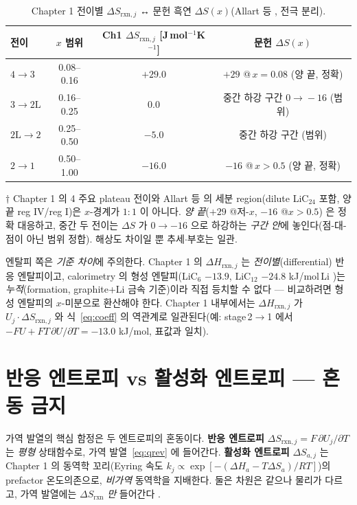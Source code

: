 \documentclass[11pt,a4paper]{article}
\newcommand{\rxn}{\mathrm{rxn}}
\begin{document}
\begin{table}[t]
\centering\small
\renewcommand{\arraystretch}{1.2}
\caption{Chapter 1 전이별 $\Delta S_{\rxn,j}$ ↔ 문헌 흑연 $\Delta S(x)$(Allart 등 \cite{allart2018}, 전극 분리).}
\label{tab:ds}
\begin{tabular}{l c c c}
\toprule
전이 & $x$ 범위 & Ch1 $\Delta S_{\rxn,j}$ [J\,mol$^{-1}$K$^{-1}$] & 문헌 $\Delta S(x)$ \\
\midrule
$4\!\to\!3$ & 0.08–0.16 & $+29.0$ & $+29$ @\,$x{=}0.08$ (양 끝, 정확) \\
$3\!\to\!2\mathrm L$ & 0.16–0.25 & $0.0$ & 중간 하강 구간 $0\!\to\!-16$ (범위) \\
$2\mathrm L\!\to\!2$ & 0.25–0.50 & $-5.0$ & 중간 하강 구간 (범위) \\
$2\!\to\!1$ & 0.50–1.00 & $-16.0$ & $-16$ @\,$x{>}0.5$ (양 끝, 정확) \\
\bottomrule
\end{tabular}

\smallskip
{\footnotesize $\dagger$ Chapter 1 의 4 주요 plateau 전이와 Allart 등 \cite{allart2018} 의 세분 region(dilute
LiC$_{24}$ 포함, 양 끝 reg IV/reg I)은 $x$-경계가 $1{:}1$ 이 아니다. \emph{양 끝}($+29$ @저-$x$, $-16$ @$x{>}0.5$)
은 정확 대응하고, 중간 두 전이는 $\Delta S$ 가 $0\to-16$ 으로 하강하는 \emph{구간 안}에 놓인다(점-대-점이 아닌
범위 정합). 해상도 차이일 뿐 추세$\cdot$부호는 일관.}
\end{table}

엔탈피 쪽은 \emph{기준 차이}에 주의한다. Chapter 1 의 $\Delta H_{\rxn,j}$ 는 \emph{전이별}(differential)
반응 엔탈피이고, calorimetry 의 형성 엔탈피(LiC$_6$ $-13.9$, LiC$_{12}$ $-24.8$ kJ/mol\,Li
\cite{chemmater2015})는 \emph{누적}(formation, graphite+Li 금속 기준)이라 직접 등치할 수 없다 — 비교하려면
형성 엔탈피의 $x$-미분으로 환산해야 한다. Chapter 1 내부에서는 $\Delta H_{\rxn,j}$ 가 $U_j\cdot\Delta S_{\rxn,j}$
와 식~\eqref{eq:coeff} 의 역관계로 일관된다(예: stage\,2$\to$1 에서 $-FU+FT\,\partial U/\partial T=-13.0$
kJ/mol, 표값과 일치).

\section{반응 엔트로피 vs 활성화 엔트로피 — 혼동 금지}\label{sec:caveat}
가역 발열의 핵심 함정은 두 엔트로피의 혼동이다. \textbf{반응 엔트로피} $\Delta S_{\rxn,j}=F\,\partial U_j/\partial T$
는 \emph{평형} 상태함수로, 가역 발열~\eqref{eq:qrev} 에 들어간다. \textbf{활성화 엔트로피} $\Delta S_{a,j}$ 는
Chapter 1 의 동역학 꼬리(Eyring 속도 $k_j\propto\exp[-(\Delta H_{a}-T\Delta S_a)/RT]$)의 prefactor
온도의존으로, \emph{비가역} 동역학을 지배한다. 둘은 차원은 같으나 물리가 다르고, 가역 발열에는 $\Delta S_{\rxn}$
\emph{만} 들어간다 \cite{msmr_partI}.
\end{document}
